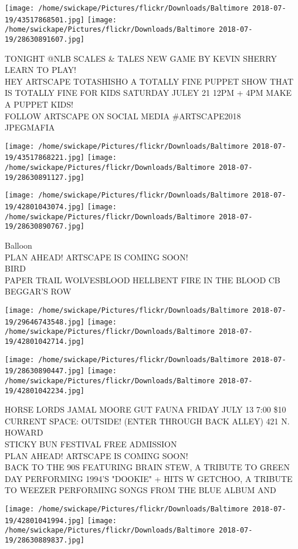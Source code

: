 \documentclass[10pt,letterpaper]{article}
\begin{document}
\texttt{[image: /home/swickape/Pictures/flickr/Downloads/Baltimore 2018-07-19/43517868501.jpg]}
\texttt{[image: /home/swickape/Pictures/flickr/Downloads/Baltimore 2018-07-19/28630891607.jpg]}

TONIGHT @NLB SCALES \& TALES NEW GAME BY KEVIN SHERRY LEARN TO PLAY!\\
HEY ARTSCAPE TOTASHISHO A TOTALLY FINE PUPPET SHOW THAT IS TOTALLY FINE FOR KIDS SATURDAY JULEY 21 12PM + 4PM MAKE A PUPPET KIDS!\\
FOLLOW ARTSCAPE ON SOCIAL MEDIA \#ARTSCAPE2018\\
JPEGMAFIA
\pagebreak

\texttt{[image: /home/swickape/Pictures/flickr/Downloads/Baltimore 2018-07-19/43517868221.jpg]}
\texttt{[image: /home/swickape/Pictures/flickr/Downloads/Baltimore 2018-07-19/28630891127.jpg]}

\texttt{[image: /home/swickape/Pictures/flickr/Downloads/Baltimore 2018-07-19/42801043074.jpg]}
\texttt{[image: /home/swickape/Pictures/flickr/Downloads/Baltimore 2018-07-19/28630890767.jpg]}

Balloon\\
PLAN AHEAD!  ARTSCAPE IS COMING SOON!\\
BIRD\\
PAPER TRAIL WOLVESBLOOD HELLBENT FIRE IN THE BLOOD CB BEGGAR'S ROW
\pagebreak

\texttt{[image: /home/swickape/Pictures/flickr/Downloads/Baltimore 2018-07-19/29646743548.jpg]}
\texttt{[image: /home/swickape/Pictures/flickr/Downloads/Baltimore 2018-07-19/42801042714.jpg]}

\texttt{[image: /home/swickape/Pictures/flickr/Downloads/Baltimore 2018-07-19/28630890447.jpg]}
\texttt{[image: /home/swickape/Pictures/flickr/Downloads/Baltimore 2018-07-19/42801042234.jpg]}

HORSE LORDS JAMAL MOORE GUT FAUNA FRIDAY JULY 13 7:00 \$10 CURRENT SPACE: OUTSIDE! (ENTER THROUGH BACK ALLEY) 421 N. HOWARD\\
STICKY BUN FESTIVAL FREE ADMISSION\\
PLAN AHEAD!  ARTSCAPE IS COMING SOON!\\
BACK TO THE 90S FEATURING BRAIN STEW, A TRIBUTE TO GREEN DAY PERFORMING 1994'S "DOOKIE" + HITS W GETCHOO, A TRIBUTE TO WEEZER PERFORMING SONGS FROM THE BLUE ALBUM AND
\pagebreak

\texttt{[image: /home/swickape/Pictures/flickr/Downloads/Baltimore 2018-07-19/42801041994.jpg]}
\texttt{[image: /home/swickape/Pictures/flickr/Downloads/Baltimore 2018-07-19/28630889837.jpg]}
\end{document}
